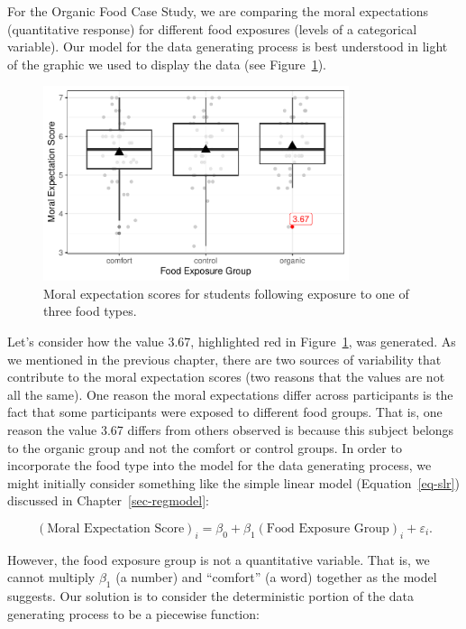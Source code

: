 \documentclass[
  letterpaper,
  DIV=11,
  numbers=noendperiod]{scrreprt}
\theoremstyle{definition}
\theoremstyle{definition}
\theoremstyle{plain}
\theoremstyle{remark}
\begin{document}
For the Organic Food Case Study, we are comparing the moral expectations
(quantitative response) for different food exposures (levels of a
categorical variable). Our model for the data generating process is best
understood in light of the graphic we used to display the data (see
Figure~\ref{fig-anovamodel-organic-plot}).

\begin{figure}

{\centering \includegraphics[width=0.8\textwidth,height=\textheight]{./images/fig-anovamodel-organic-plot-1.pdf}

}

\caption{\label{fig-anovamodel-organic-plot}Moral expectation scores for
students following exposure to one of three food types.}

\end{figure}

Let's consider how the value 3.67, highlighted red in
Figure~\ref{fig-anovamodel-organic-plot}, was generated. As we mentioned
in the previous chapter, there are two sources of variability that
contribute to the moral expectation scores (two reasons that the values
are not all the same). One reason the moral expectations differ across
participants is the fact that some participants were exposed to
different food groups. That is, one reason the value 3.67 differs from
others observed is because this subject belongs to the organic group and
not the comfort or control groups. In order to incorporate the food type
into the model for the data generating process, we might initially
consider something like the simple linear model (Equation~\ref{eq-slr})
discussed in Chapter~\ref{sec-regmodel}:

\[(\text{Moral Expectation Score})_i = \beta_0 + \beta_1 (\text{Food Exposure Group})_i + \varepsilon_i.\]

However, the food exposure group is not a quantitative variable. That
is, we cannot multiply \(\beta_1\) (a number) and ``comfort'' (a word)
together as the model suggests. Our solution is to consider the
deterministic portion of the data generating process to be a piecewise
function:
\end{document}
